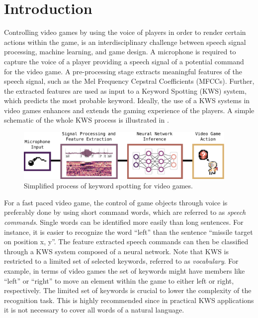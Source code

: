 
\chapter{Introduction}\label{sec:intro}
Controlling video games by using the voice of players in order to render certain actions within the game, is an interdisciplinary challenge between speech signal processing, machine learning, and game design.
A microphone is required to capture the voice of a player providing a speech signal of a potential command for the video game.
A pre-processing stage extracts meaningful features of the speech signal, such as the Mel Frequency Cepstral Coefficients (MFCCs).
Further, the extracted features are used as input to a Keyword Spotting (KWS) system, which predicts the most probable keyword.
Ideally, the use of a KWS systems in video games enhances and extends the gaming experience of the players.
A simple schematic of the whole KWS process is illustrated in .
\begin{figure}[!ht]
  \centering
    \includegraphics[width=0.95\textwidth]{./1_intro/figs/intro_kws.pdf}
  \caption{Simplified process of keyword spotting for video games.}
  \label{fig:intro_kws}
\end{figure}
\FloatBarrier
\noindent
For a fast paced video game, the control of game objects through voice is preferably done by using short command words, which are referred to as \emph{speech commands}.
Single words can be identified more easily than long sentences.
For instance, it is easier to recognize the word \enquote{left} than the sentence \enquote{missile target on position x, y}.
The feature extracted speech commands can then be classified through a KWS system composed of a neural network.
Note that KWS is restricted to a limited set of selected keywords, referred to as \emph{vocabulary}.
For example, in terms of video games the set of keywords might have members like \enquote{left} or \enquote{right} to move an element within the game to either left or right, respectively.
The limited set of keywords is crucial to lower the complexity of the recognition task.
This is highly recommended since in practical KWS applications it is not necessary to cover all words of a natural language.
